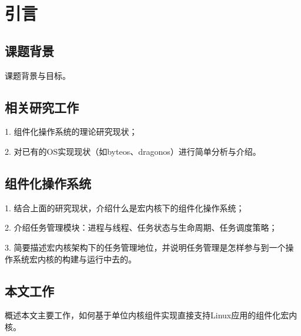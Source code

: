 
\chapter{引言}


\section{课题背景}

课题背景与目标。



\section{相关研究工作}

1. 组件化操作系统的理论研究现状；

2. 对已有的OS实现现状（如byteos、dragonos）进行简单分析与介绍。



\section{组件化操作系统}

1. 结合上面的研究现状，介绍什么是宏内核下的组件化操作系统；

2. 介绍任务管理模块：进程与线程、任务状态与生命周期、任务调度策略；

3. 简要描述宏内核架构下的任务管理地位，并说明任务管理是怎样参与到一个操作系统宏内核的构建与运行中去的。




\section{本文工作}

概述本文主要工作，如何基于单位内核组件实现直接支持Linux应用的组件化宏内核。